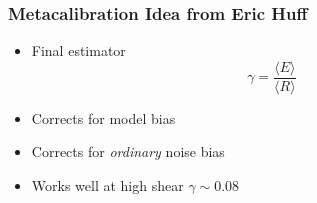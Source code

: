 \documentclass{beamer}
\begin{document}
\frame
{
    \frametitle{Metacalibration Idea from Eric Huff}

 
    \begin{itemize}
        \item Final estimator
            \begin{equation}
                \gamma = \frac{\langle E \rangle }{ \langle R \rangle} \nonumber
            \end{equation}
       
        \item Corrects for {\color{lightskyblue} model bias}

        \item Corrects for {\em ordinary} {\color{gold} noise bias}

        \item Works well at {\color{lightsteelblue} high shear $\gamma \sim 0.08$}

    \end{itemize}

}
\end{document}
